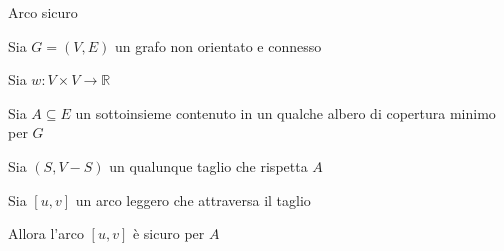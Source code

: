 \begin{frame}{Arco sicuro}

\vspace{-9pt}
\begin{myboxtitle}[Teorema]
\BIL
\item Sia $G=(V,E)$ un grafo non orientato e connesso 
\item Sia $w: V \times V \rightarrow \mathbb{R}$
\item Sia $A \subseteq E$ un sottoinsieme contenuto in un qualche albero di copertura minimo per $G$ 
\item Sia $(S,V-S)$ un qualunque taglio che rispetta $A$
\item Sia $[u,v]$ un arco leggero che attraversa il taglio
\EIL

Allora  l'arco $[u,v]$ è sicuro per $A$	
\end{myboxtitle}
\end{frame}


